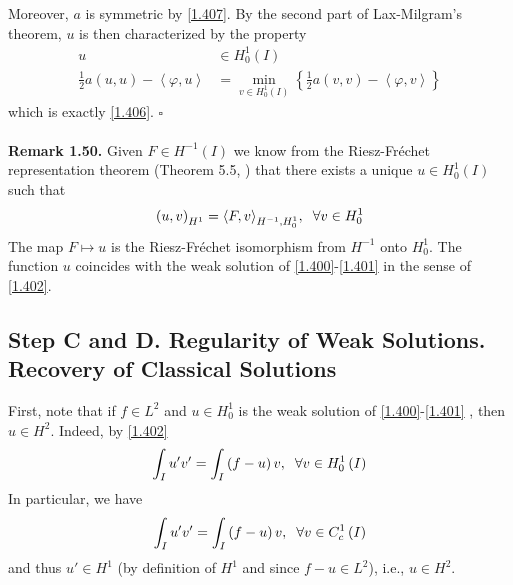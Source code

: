 \documentclass[a4paper,oneside]{article}
\numberwithin{equation}{section}
\begin{document}
Moreover, $a$ is symmetric by \eqref{1.407}. By the second part of Lax-Milgram's theorem, $u$ is then characterized by the property
\begin{align}
u &\in H_0^1\left( I \right)\\
\frac{1}{2}a\left( {u,u} \right) - \left\langle {\varphi ,u} \right\rangle & = \mathop {\min }\limits_{v \in H_0^1\left(I\right)} \left\{ {\frac{1}{2}a\left( {v,v} \right) - \left\langle {\varphi ,v} \right\rangle } \right\}
\end{align}
which is exactly \eqref{1.406}. \hfill $\square$\\
\\
\textbf{Remark 1.50.} Given $F\in H^{-1}\left(I\right)$ we know from the Riesz-Fr\'{e}chet representation theorem (Theorem 5.5, \cite{1}) that there exists a unique $u\in H_0^1\left(I\right)$ such that
\begin{align}
{\left( {u,v} \right)_{{H^1}}} = {\left\langle {F,v} \right\rangle _{{H^{ - 1}},H_0^1}},\hspace{0.2cm}\forall v \in H_0^1
\end{align}
The map $F\mapsto u$ is the Riesz-Fr\'{e}chet isomorphism from $H^{-1}$ onto $H_0^1$. The function $u$ coincides with the weak solution of \eqref{1.400}-\eqref{1.401} in the sense of \eqref{1.402}.
\subsection*{Step C and D. Regularity of Weak Solutions. Recovery of Classical Solutions}
First, note that if $f\in L^2$ and $u\in H_0^1$ is the weak solution of \eqref{1.400}-\eqref{1.401} , then $u\in H^2$. Indeed, by \eqref{1.402}
\begin{align}
\int_I {u'v'}  = \int_I {\left( {f - u} \right)v} ,\hspace{0.2cm}\forall v \in H_0^1\left( I \right)
\end{align}
In particular, we have
\begin{align}
\label{1.420}
\int_I {u'v'}  = \int_I {\left( {f - u} \right)v} ,\hspace{0.2cm}\forall v \in C_c^1\left( I \right)
\end{align}
and thus $u'\in H^1$ (by definition of $H^1$ and since $f-u\in L^2$), i.e., $u\in H^2$. 
\end{document}
